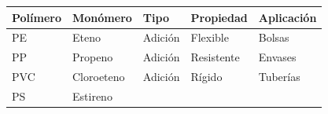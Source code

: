 \begin{center}

\scriptsize

\renewcommand{\arraystretch}{1.25}

\begin{tabular}{lllll}

\toprule

\textbf{Polímero}

&

\textbf{Monómero}

&

\textbf{Tipo}

&

\textbf{Propiedad}

&

\textbf{Aplicación}

\\

\midrule

PE

&

Eteno

&

Adición

&

Flexible

&

Bolsas

\\

PP

&

Propeno

&

Adición

&

Resistente

&

Envases

\\

PVC

&

Cloroeteno

&

Adición

&

Rígido

&

Tuberías

\\

PS

&

Estireno


\end{tabular}
\end{center}
